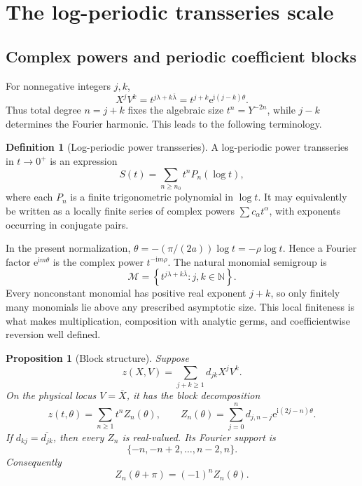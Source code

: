 \documentclass[11pt,oneside]{article}
\theoremstyle{plain}
\newtheorem{proposition}[theorem]{Proposition}
\theoremstyle{definition}
\newtheorem{definition}[theorem]{Definition}
\theoremstyle{remark}
\newcommand{\e}{\mathrm{e}}
\newcommand{\ii}{\mathrm{i}}
\newcommand{\N}{\mathbb{N}}
\newcommand{\Mcal}{\mathcal{M}}
\begin{document}
\section{The log-periodic transseries scale}
\label{sec:scale}

\subsection{Complex powers and periodic coefficient blocks}

For nonnegative integers \(j,k\),
\begin{equation}
 X^jV^k
 =t^{j\lambda+k\overline\lambda}
 =t^{j+k}\e^{\ii(j-k)\theta}.
 \label{eq:monomial-block}
\end{equation}
Thus total degree \(n=j+k\) fixes the algebraic size \(t^n=Y^{-2n}\), while
\(j-k\) determines the Fourier harmonic.  This leads to the following
terminology.

\begin{definition}[Log-periodic power transseries]
\label{def:log-periodic}
A log-periodic power transseries in \(t\to0^+\) is an expression
\begin{equation}
 S(t)=\sum_{n\ge n_0}t^nP_n(\log t),
 \label{eq:logperiodic-definition}
\end{equation}
where each \(P_n\) is a finite trigonometric polynomial in \(\log t\).  It may
equivalently be written as a locally finite series of complex powers
\(\sum c_\alpha t^\alpha\), with exponents occurring in conjugate pairs.
\end{definition}

In the present normalization,
\(\theta=-(\pi/(2a))\log t=-\rho\log t\).  Hence a Fourier factor
\(\e^{\ii m\theta}\) is the complex power \(t^{-\ii m\rho}\).  The natural
monomial semigroup is
\begin{equation}
 \Mcal=\left\{t^{j\lambda+k\overline\lambda}:j,k\in\N\right\}.
 \label{eq:monomial-semigroup}
\end{equation}
Every nonconstant monomial has positive real exponent \(j+k\), so only
finitely many monomials lie above any prescribed asymptotic size.  This local
finiteness is what makes multiplication, composition with analytic germs, and
coefficientwise reversion well defined.

\begin{proposition}[Block structure]
\label{prop:block-structure}
Suppose
\[
 z(X,V)=\sum_{j+k\ge1}d_{jk}X^jV^k.
\]
On the physical locus \(V=\overline X\), it has the block decomposition
\begin{equation}
 z(t,\theta)=\sum_{n\ge1}t^nZ_n(\theta),
 \qquad
 Z_n(\theta)=\sum_{j=0}^nd_{j,n-j}\e^{\ii(2j-n)\theta}.
 \label{eq:block-decomposition}
\end{equation}
If \(d_{k j}=\overline{d_{jk}}\), then every \(Z_n\) is real-valued.  Its
Fourier support is
\begin{equation}
 \{-n,-n+2,\ldots,n-2,n\}.
 \label{eq:Fourier-support}
\end{equation}
Consequently
\begin{equation}
 Z_n(\theta+\pi)=(-1)^nZ_n(\theta).
 \label{eq:block-parity}
\end{equation}
\end{proposition}
\end{document}
